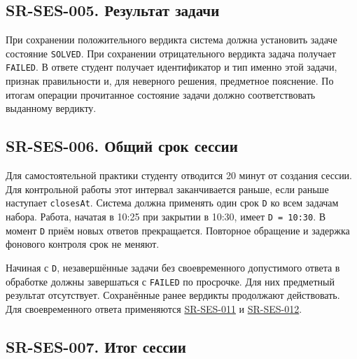 \documentclass[12pt,a4paper]{article}
\begin{document}
\subsection{SR-SES-005. Результат задачи}\label{sr-ses-005-ux440ux435ux437ux443ux43bux44cux442ux430ux442-ux437ux430ux434ux430ux447ux438}

\hypertarget{sr-ses-005-результат-задачи}{}

\hypertarget{sr-ses-005}{}

При сохранении положительного вердикта система должна установить задаче состояние \texttt{SOLVED}. При сохранении отрицательного вердикта задача получает \texttt{FAILED}. В ответе студент получает идентификатор и тип именно этой задачи, признак правильности и, для неверного решения, предметное пояснение. По итогам операции прочитанное состояние задачи должно соответствовать выданному вердикту.

\subsection{SR-SES-006. Общий срок сессии}\label{sr-ses-006-ux43eux431ux449ux438ux439-ux441ux440ux43eux43a-ux441ux435ux441ux441ux438ux438}

\hypertarget{sr-ses-006-общий-срок-сессии}{}

\hypertarget{sr-ses-006}{}

Для самостоятельной практики студенту отводится 20 минут от создания сессии. Для контрольной работы этот интервал заканчивается раньше, если раньше наступает \texttt{closesAt}. Система должна применять один срок \texttt{D} ко всем задачам набора. Работа, начатая в 10:25 при закрытии в 10:30, имеет \texttt{D\ =\ 10:30}. В момент \texttt{D} приём новых ответов прекращается. Повторное обращение и задержка фонового контроля срок не меняют.

Начиная с \texttt{D}, незавершённые задачи без своевременного допустимого ответа в обработке должны завершаться с \texttt{FAILED} по просрочке. Для них предметный результат отсутствует. Сохранённые ранее вердикты продолжают действовать. Для своевременного ответа применяются {\hyperlink{sr-ses-011}{SR-SES-011}} и {\hyperlink{sr-ses-012}{SR-SES-012}}.

\subsection{SR-SES-007. Итог сессии}\label{sr-ses-007-ux438ux442ux43eux433-ux441ux435ux441ux441ux438ux438}
\end{document}
